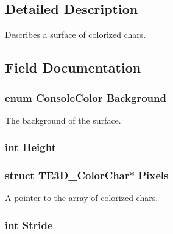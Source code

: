 \subsection{Detailed Description}
Describes a surface of colorized chars. 

\subsection{Field Documentation}
\hypertarget{struct_t_e3_d___surface_aa0033422d8fc4f65a5397d699edb0719}{
\subsubsection[{Background}]{\setlength{\rightskip}{0pt plus 5cm}enum {\bf Console\-Color} Background}}\label{struct_t_e3_d___surface_aa0033422d8fc4f65a5397d699edb0719}


The background of the surface. 

\hypertarget{struct_t_e3_d___surface_aaadefba794062a2ca7e58ceb10b955a1}{
\subsubsection[{Height}]{\setlength{\rightskip}{0pt plus 5cm}int Height}}\label{struct_t_e3_d___surface_aaadefba794062a2ca7e58ceb10b955a1}
\hypertarget{struct_t_e3_d___surface_a9f3c0fd0d0a5be99cb36f5995864cf63}{
\subsubsection[{Pixels}]{\setlength{\rightskip}{0pt plus 5cm}struct {\bf T\-E3\-D\-\_\-\-Color\-Char}$\ast$ Pixels}}\label{struct_t_e3_d___surface_a9f3c0fd0d0a5be99cb36f5995864cf63}


A pointer to the array of colorized chars. 

\hypertarget{struct_t_e3_d___surface_a2bc9777201b278cf5e84e9124ffbba71}{
\subsubsection[{Stride}]{\setlength{\rightskip}{0pt plus 5cm}int Stride}}\label{struct_t_e3_d___surface_a2bc9777201b278cf5e84e9124ffbba71}


